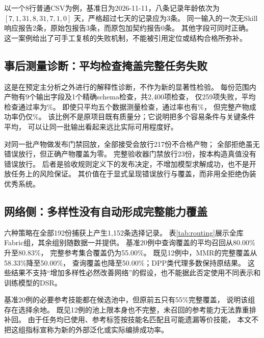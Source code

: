 以一个8行普通CSV为例，基准日为2026-11-11，八条记录年龄依次为
$[7,1,31,8,31,7,1,0]$ 天，严格超过七天的记录应为3条。
同一输入的一次无Skill响应报告2条，原始包报告3条，而原包加契约报告0条。
其他字段可同时正确。
这一案例给出了可手工复核的失败机制，不能被引用定位或结构合格所弥补。

\subsection{事后测量诊断：平均检查掩盖完整任务失败}
这是在预定主分析之外进行的解释性诊断，不作为新的显著性检验。
每份范围内产物有9个输出字段及1个精确schema检查，共2,400项检查，
仅259项失败，平均检查通过率为\CheckPassRate\%。
即使只平均五个数据测量检查，通过率也有\MeasurePassRate\%，
但完整产物成功率仍仅\NormalPassRate\%。
该比例不是原项目既有质量分；它说明把多个容易条件与关键条件平均，
可以让同一批输出看起来远比实际可用程度好。

对同一批产物做发布门禁回放，全部接受会放行217份不合格产物；
全部拒绝虽无错误放行，但正确产物覆盖为零。
完整验收器门禁放行23份，按本构造真值没有错误放行。
后者是验收规则定义下的发布决定，不增加模型求解成功，也不是开放任务上的风险保证。
其价值在于显式呈现错误放行与覆盖，而非用全拒绝伪装优秀系统。

\subsection{网络侧：多样性没有自动形成完整能力覆盖}

六种策略在全部192份捕获上产生1,152条选择记录。
表\ref{tab:routing}展示全库Fabric组，其余组别随数据一并提供。
基准20例中查询覆盖的平均召回从80.00\%升至80.83\%，
完整参考集合覆盖仍为55.00\%。
既见12例中，MMR的完整覆盖从58.33\%降至50.00\%，
查询覆盖也降至50.00\%；DPP类代理多数保持原结果。
这些结果不支持“增加多样性必然改善网络”的假设，也不能据此否定使用不同表示和训练模型的DSR。

基准20例的必要参考技能都在候选池中，但原前五只有55\%完整覆盖，
说明该组存在选择余地。
既见12例的池上限本身也不完整，未召回的参考能力无法靠重排补回。
由于任务均已使用、参考标签按技能名匹配且可能遗漏等价技能，
本文不把这组指标宣称为新的外部泛化或实际编排成功率。
